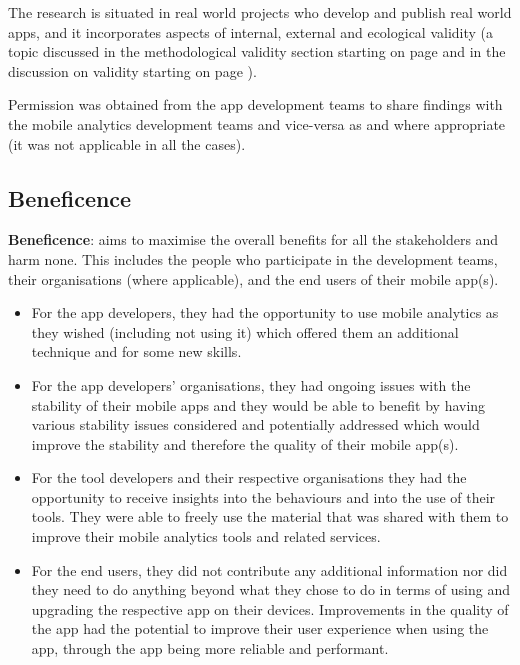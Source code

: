 The research is situated in real world projects who develop and publish real world apps, and it incorporates aspects of internal, external and ecological validity (a topic discussed in the methodological validity section starting on page \pageref{methodology-threats-to-validity-section} and in the discussion on validity starting on page \pageref{discussion-threats-to-validity-section}).

Permission was obtained from the app development teams to share findings with the mobile analytics development teams and vice-versa as and where appropriate (it was not applicable in all the cases).


\subsection{Beneficence}
\textbf{Beneficence}: aims to maximise the overall benefits for all the stakeholders and harm none. This includes the people who participate in the development teams, their organisations (where applicable), and the end users of their mobile app(s). 

\begin{itemize}
    \item For the app developers, they had the opportunity to use mobile analytics as they wished (including not using it) which offered them an additional technique and for some new skills.
    \item For the app developers' organisations, they had ongoing issues with the stability of their mobile apps and they would be able to benefit by having various stability issues considered and potentially addressed which would improve the stability and therefore the quality of their mobile app(s).
    \item For the tool developers and their respective organisations they had the opportunity to receive insights into the behaviours and into the use of their tools. They were able to freely use the material that was shared with them to improve their mobile analytics tools and related services.
    \item For the end users, they did not contribute any additional information nor did they need to do anything beyond what they chose to do in terms of using and upgrading the respective app on their devices. Improvements in the quality of the app had the potential to improve their user experience when using the app, through the app being more reliable and performant.
\end{itemize}

